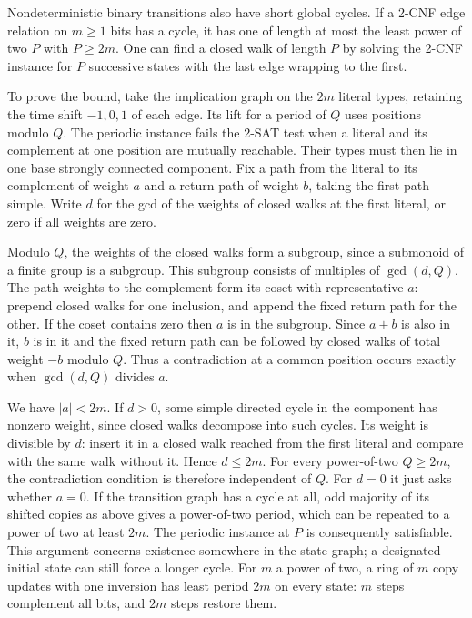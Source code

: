 Nondeterministic binary transitions also have
short global cycles. If a 2-CNF edge relation
on $m\ge1$ bits has a cycle, it has one of length
at most the least power of two $P$ with $P\ge2m$.
One can find a closed walk of length $P$ by
solving the 2-CNF instance for $P$ successive
states with the last edge wrapping to the first.

To prove the bound, take the implication graph
on the $2m$ literal types, retaining the time
shift $-1,0,1$ of each edge. Its lift for a
period of $Q$ uses positions modulo $Q$.
The periodic instance fails the 2-SAT test
when a literal and its complement at one
position are mutually reachable. Their types
must then lie in one base strongly connected
component. Fix a path from the literal to its
complement of weight $a$ and a return path of
weight $b$, taking the first path simple.
Write $d$ for the gcd of the weights of closed
walks at the first literal, or zero if all
weights are zero.

Modulo $Q$, the weights of the closed walks
form a subgroup, since a submonoid of a finite
group is a subgroup. This subgroup consists
of multiples of $\gcd(d,Q)$. The path weights
to the complement form its coset with
representative $a$: prepend closed walks for
one inclusion, and append the fixed return
path for the other. If the coset contains
zero then $a$ is in the subgroup. Since
$a+b$ is also in it, $b$ is in it and the
fixed return path can be followed by closed
walks of total weight $-b$ modulo $Q$.
Thus a contradiction at a common position
occurs exactly when $\gcd(d,Q)$ divides $a$.

We have $|a|<2m$. If $d>0$, some simple
directed cycle in the component has nonzero
weight, since closed walks decompose into
such cycles. Its weight is divisible by $d$:
insert it in a closed walk reached from the
first literal and compare with the same walk
without it. Hence $d\le2m$. For every
power-of-two $Q\ge2m$, the contradiction
condition is therefore independent of $Q$.
For $d=0$ it just asks whether $a=0$.
If the transition graph has a cycle at all,
odd majority of its shifted copies as above
gives a power-of-two period, which can be
repeated to a power of two at least $2m$.
The periodic instance at $P$ is consequently
satisfiable. This argument concerns existence
somewhere in the state graph; a designated
initial state can still force a longer cycle.
For $m$ a power of two, a ring of $m$ copy
updates with one inversion has least period
$2m$ on every state: $m$ steps complement
all bits, and $2m$ steps restore them.

